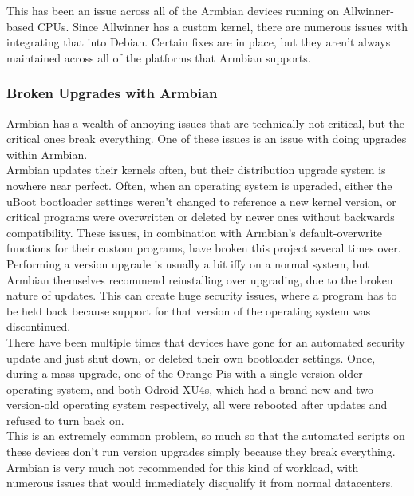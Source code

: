 \documentclass[12pt]{spieman}  %
\begin{document}
This has been an issue across all of the Armbian devices running on Allwinner-based CPUs. Since Allwinner has a custom kernel, there are numerous issues with integrating that into Debian. Certain fixes are in place, but they aren’t always maintained across all of the platforms that Armbian supports.\\

\subsubsection{Broken Upgrades with Armbian}
\label{subsubsec:broken-upgrades}

Armbian has a wealth of annoying issues that are technically not critical, but the critical ones break everything. One of these issues is an issue with doing upgrades within Armbian.\\

Armbian updates their kernels often, but their distribution upgrade system is nowhere near perfect. Often, when an operating system is upgraded, either the uBoot bootloader settings weren't changed to reference a new kernel version, or critical programs were overwritten or deleted by newer ones without backwards compatibility. These issues, in combination with Armbian's default-overwrite functions for their custom programs, have broken this project several times over.\\

Performing a version upgrade is usually a bit iffy on a normal system, but Armbian themselves recommend reinstalling over upgrading, due to the broken nature of updates. This can create huge security issues, where a program has to be held back because support for that version of the operating system was discontinued.\\

There have been multiple times that devices have gone for an automated security update and just shut down, or deleted their own bootloader settings. Once, during a mass upgrade, one of the Orange Pis with a single version older operating system, and both Odroid XU4s, which had a brand new and two-version-old operating system respectively, all were rebooted after updates and refused to turn back on.\\

This is an extremely common problem, so much so that the automated scripts on these devices don't run version upgrades simply because they break everything. Armbian is very much not recommended for this kind of workload, with numerous issues that would immediately disqualify it from normal datacenters.
\end{document}
